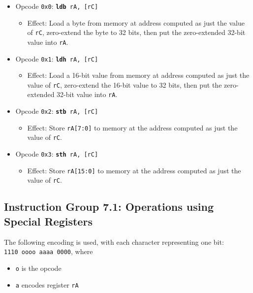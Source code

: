 \documentclass{article}
\begin{document}
	\singlespacing
	\begin{itemize}
		\item Opcode \texttt{0x0}:
			\texttt{\textbf{ldb} rA, [rC]}
		\begin{itemize}
			\item Effect:  Load a byte from memory at address computed as
			just the value of \texttt{rC}, zero-extend the byte to 32 bits,
			then put the zero-extended 32-bit value into \texttt{rA}.
		\end{itemize}
		\item Opcode \texttt{0x1}:
			\texttt{\textbf{ldh} rA, [rC]}
		\begin{itemize}
			\item Effect:  Load a 16-bit value from memory at address
			computed as just the value of \texttt{rC}, zero-extend the
			16-bit value to 32 bits, then put the zero-extended 32-bit
			value into \texttt{rA}.
		\end{itemize}
		\item Opcode \texttt{0x2}:
			\texttt{\textbf{stb} rA, [rC]}
		\begin{itemize}
			\item Effect:  Store \texttt{rA[7:0]} to memory at the address
			computed as just the value of \texttt{rC}.
		\end{itemize}
		\item Opcode \texttt{0x3}:
			\texttt{\textbf{sth} rA, [rC]}
		\begin{itemize}
			\item Effect:  Store \texttt{rA[15:0]} to memory at the address
			computed as just the value of \texttt{rC}.
		\end{itemize}
	\end{itemize}
	\doublespacing

	\subsection{Instruction Group 7.1:  Operations using Special Registers}
	The following encoding is used, with each character representing one
	bit:  \\
	\texttt{1110 oooo aaaa 0000}, where

	\singlespacing
	\begin{itemize}
		\item \texttt{o} is the opcode
		\item \texttt{a} encodes register \texttt{rA}
	\end{itemize}
	\doublespacing
\end{document}
